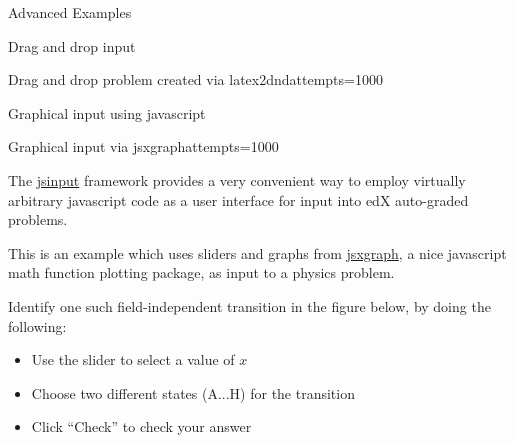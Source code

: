 \begin{edXchapter}{Advanced Examples}
\begin{edXsection}{Drag and drop input}
\begin{edXvertical}
\begin{edXproblem}{Drag and drop problem created via latex2dnd}{attempts=1000}

\end{edXproblem}


\end{edXvertical}

\end{edXsection}


\begin{edXsection}{Graphical input using javascript}

\begin{edXvertical}

\begin{edXproblem}{Graphical input via jsxgraph}{attempts=1000}

The \href{http://edx.readthedocs.org/projects/devdata/en/latest/course_data_formats/jsinput.html}{jsinput} framework provides a very convenient way to
employ virtually arbitrary javascript code as a user interface for
input into edX auto-graded problems.  

This is an example which uses sliders and graphs from
\href{http://jsxgraph.uni-bayreuth.de/}{jsxgraph}, a nice javascript
math function plotting package, as input to a physics problem.

     Identify one such field-independent transition in the figure
     below, by doing the following:
     \begin{itemize}
     \item Use the slider to select a value of $x$
     \item Choose two different states (A...H) for the transition
     \item Click ``Check'' to check your answer
     \end{itemize}



%

\end{edXproblem}


\end{edXvertical}


\end{edXsection}


\end{edXchapter}
